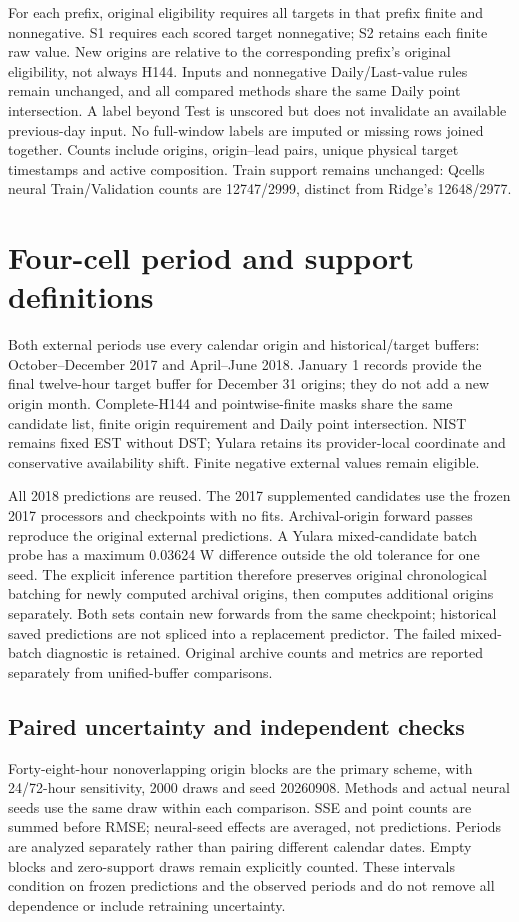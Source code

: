 For each prefix, original eligibility requires all targets in that prefix finite and nonnegative. S1 requires each scored target nonnegative; S2 retains each finite raw value. New origins are relative to the corresponding prefix's original eligibility, not always H144. Inputs and nonnegative Daily/Last-value rules remain unchanged, and all compared methods share the same Daily point intersection. A label beyond Test is unscored but does not invalidate an available previous-day input. No full-window labels are imputed or missing rows joined together. Counts include origins, origin--lead pairs, unique physical target timestamps and active composition. Train support remains unchanged: Qcells neural Train/Validation counts are 12747/2999, distinct from Ridge's 12648/2977.

\section{Four-cell period and support definitions}
Both external periods use every calendar origin and historical/target buffers: October--December 2017 and April--June 2018. January 1 records provide the final twelve-hour target buffer for December 31 origins; they do not add a new origin month. Complete-H144 and pointwise-finite masks share the same candidate list, finite origin requirement and Daily point intersection. NIST remains fixed EST without DST; Yulara retains its provider-local coordinate and conservative availability shift. Finite negative external values remain eligible.

All 2018 predictions are reused. The 2017 supplemented candidates use the frozen 2017 processors and checkpoints with no fits. Archival-origin forward passes reproduce the original external predictions. A Yulara mixed-candidate batch probe has a maximum 0.03624 W difference outside the old tolerance for one seed. The explicit inference partition therefore preserves original chronological batching for newly computed archival origins, then computes additional origins separately. Both sets contain new forwards from the same checkpoint; historical saved predictions are not spliced into a replacement predictor. The failed mixed-batch diagnostic is retained. Original archive counts and metrics are reported separately from unified-buffer comparisons.

\subsection{Paired uncertainty and independent checks}
Forty-eight-hour nonoverlapping origin blocks are the primary scheme, with 24/72-hour sensitivity, 2000 draws and seed 20260908. Methods and actual neural seeds use the same draw within each comparison. SSE and point counts are summed before RMSE; neural-seed effects are averaged, not predictions. Periods are analyzed separately rather than pairing different calendar dates. Empty blocks and zero-support draws remain explicitly counted. These intervals condition on frozen predictions and the observed periods and do not remove all dependence or include retraining uncertainty.

